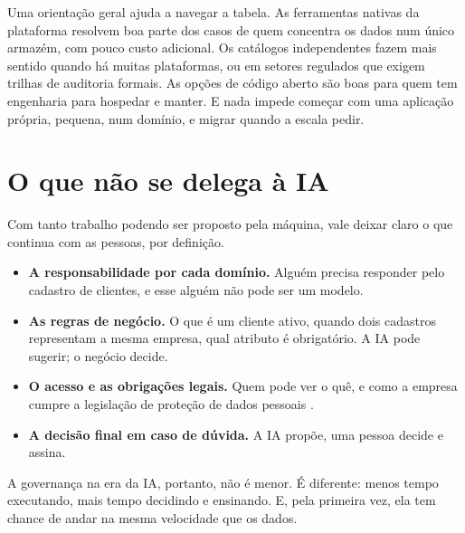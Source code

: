 Uma orientação geral ajuda a navegar a tabela. As ferramentas nativas da plataforma
resolvem boa parte dos casos de quem concentra os dados num único armazém, com pouco custo
adicional. Os catálogos independentes fazem mais sentido quando há muitas plataformas, ou em
setores regulados que exigem trilhas de auditoria formais. As opções de código aberto são
boas para quem tem engenharia para hospedar e manter. E nada impede começar com uma
aplicação própria, pequena, num domínio, e migrar quando a escala pedir.

\section{O que não se delega à IA}
\label{sec:gov-nao-delegar}

Com tanto trabalho podendo ser proposto pela máquina, vale deixar claro o que continua com
as pessoas, por definição.

\begin{itemize}
  \item \textbf{A responsabilidade por cada domínio.} Alguém precisa responder pelo cadastro
    de clientes, e esse alguém não pode ser um modelo.
  \item \textbf{As regras de negócio.} O que é um cliente ativo, quando dois cadastros
    representam a mesma empresa, qual atributo é obrigatório. A IA pode sugerir; o negócio
    decide.
  \item \textbf{O acesso e as obrigações legais.} Quem pode ver o quê, e como a empresa
    cumpre a legislação de proteção de dados pessoais \parencite{lgpd2018}.
  \item \textbf{A decisão final em caso de dúvida.} A IA propõe, uma pessoa decide e assina.
\end{itemize}

A governança na era da IA, portanto, não é menor. É diferente: menos tempo executando, mais
tempo decidindo e ensinando. E, pela primeira vez, ela tem chance de andar na mesma
velocidade que os dados.

\begin{leituras}
\end{leituras}
